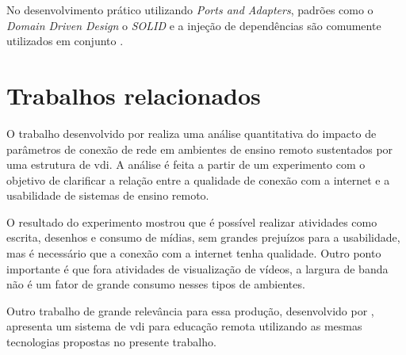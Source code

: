 No desenvolvimento prático utilizando \textit{Ports and Adapters}, padrões como o \textit{Domain Driven Design} o \textit{SOLID} e a injeção de dependências são comumente utilizados em conjunto \citep{cockburn2017}.










\section{Trabalhos relacionados}
\label{sec:trabalhosRelacionados}

O trabalho desenvolvido por \citet{qoselearning} realiza uma análise quantitativa do impacto de
parâmetros de conexão de rede em ambientes de ensino remoto sustentados por uma estrutura de \gls{vdi}.
A análise é feita a partir de um experimento com o objetivo de clarificar a relação entre a qualidade de
conexão com a internet e a usabilidade de sistemas de ensino remoto.

O resultado do experimento mostrou que é possível realizar atividades como escrita, desenhos e
consumo de mídias, sem grandes prejuízos para a usabilidade, mas é necessário que a conexão com a
internet tenha qualidade. Outro ponto importante é que fora atividades de visualização de vídeos, a
largura de banda não é um fator de grande consumo nesses tipos de ambientes.

Outro trabalho de grande relevância para essa produção, desenvolvido por \citet{edufirestick},
apresenta um sistema de \gls{vdi} para educação remota utilizando as mesmas tecnologias propostas
no presente trabalho. 

